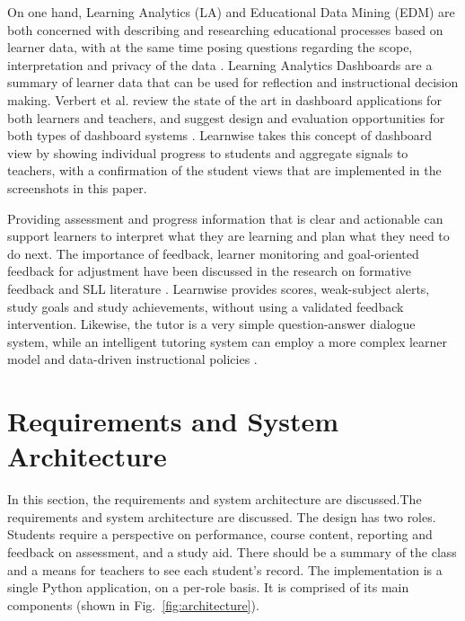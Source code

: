 \documentclass[conference]{IEEEtran}
\begin{document}
On one hand, Learning Analytics (LA) and Educational Data Mining (EDM) are both concerned with describing and researching educational processes based on learner data, with at the same time posing questions regarding the scope, interpretation and privacy of the data \cite{siemens2013,romero2010}. Learning Analytics Dashboards are a summary of learner data that can be used for reflection and instructional decision making. Verbert et al. review the state of the art in dashboard applications for both learners and teachers, and suggest design and evaluation opportunities for both types of dashboard systems \cite{verbert2014}. Learnwise takes this concept of dashboard view by showing individual progress to students and aggregate signals to teachers, with a confirmation of the student views that are implemented in the screenshots in this paper.

Providing assessment and progress information that is clear and actionable can support learners to interpret what they are learning and plan what they need to do next. The importance of feedback, learner monitoring and goal-oriented feedback for adjustment have been discussed in the research on formative feedback and SLL literature \cite{shute2008,hattie2007,nicol2006,zimmerman2002}. Learnwise provides scores, weak-subject alerts, study goals and study achievements, without using a validated feedback intervention. Likewise, the tutor is a very simple question-answer dialogue system, while an intelligent tutoring system can employ a more complex learner model and data-driven instructional policies \cite{koedinger2013}.

\section{Requirements and System Architecture}
In this section, the requirements and system architecture are discussed.The requirements and system architecture are discussed.
The design has two roles. Students require a perspective on performance, course content, reporting and feedback on assessment, and a study aid. There should be a summary of the class and a means for teachers to see each student's record. The implementation is a single Python application, on a per-role basis. It is comprised of its main components (shown in Fig.~\ref{fig:architecture}).
\end{document}
